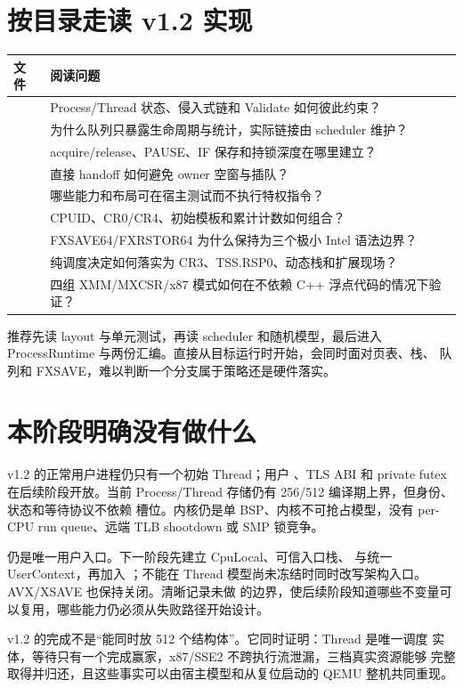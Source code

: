 \section{按目录走读 v1.2 实现}

\begin{longtable}{L{0.43\textwidth}L{0.45\textwidth}}
\toprule
文件 & 阅读问题\\
\midrule
{} &
Process/Thread 状态、侵入式链和 Validate 如何彼此约束？\\
 &
为什么队列只暴露生命周期与统计，实际链接由 scheduler 维护？\\
 &
acquire/release、PAUSE、IF 保存和持锁深度在哪里建立？\\
 &
直接 handoff 如何避免 owner 空窗与插队？\\
 &
哪些能力和布局可在宿主测试而不执行特权指令？\\
 &
CPUID、CR0/CR4、初始模板和累计计数如何组合？\\
 &
FXSAVE64/FXRSTOR64 为什么保持为三个极小 Intel 语法边界？\\
 &
纯调度决定如何落实为 CR3、TSS.RSP0、动态栈和扩展现场？\\
 &
四组 XMM/MXCSR/x87 模式如何在不依赖 C++ 浮点代码的情况下验证？\\
\bottomrule
\end{longtable}

推荐先读 layout 与单元测试，再读 scheduler 和随机模型，最后进入
ProcessRuntime 与两份汇编。直接从目标运行时开始，会同时面对页表、栈、
队列和 FXSAVE，难以判断一个分支属于策略还是硬件落实。

\section{本阶段明确没有做什么}

v1.2 的正常用户进程仍只有一个初始 Thread；用户
、TLS ABI 和 private futex 在后续阶段开放。当前
Process/Thread 存储仍有 256/512 编译期上界，但身份、状态和等待协议不依赖
槽位。内核仍是单 BSP、内核不可抢占模型，没有 per-CPU run queue、远端 TLB
shootdown 或 SMP 锁竞争。

 仍是唯一用户入口。下一阶段先建立 CpuLocal、可信入口栈、
 与统一 UserContext，再加入 ；不能在
Thread 模型尚未冻结时同时改写架构入口。AVX/XSAVE 也保持关闭。清晰记录未做
的边界，使后续阶段知道哪些不变量可以复用，哪些能力仍必须从失败路径开始设计。

\begin{keyidea}
v1.2 的完成不是“能同时放 512 个结构体”。它同时证明：Thread 是唯一调度
实体，等待只有一个完成赢家，x87/SSE2 不跨执行流泄漏，三档真实资源能够
完整取得并归还，且这些事实可以由宿主模型和从复位启动的 QEMU 整机共同重现。
\end{keyidea}
